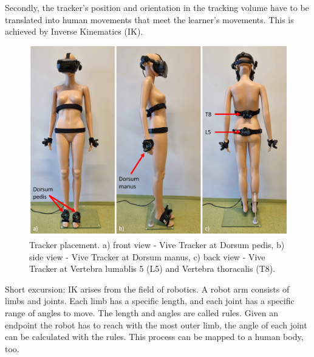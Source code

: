 Secondly, the tracker's position and orientation in the tracking volume have to be translated into human movements that meet the learner's movements. This is achieved by Inverse Kinematics (IK).\\
\begin{figure}[htb]
	\centering
	\includegraphics[width=\textwidth]{figures/trackerPlacement.png}	
	\caption[Tracker placement]{Tracker placement. a) front view - Vive Tracker at Dorsum pedis, b) side view - Vive Tracker at Dorsum manus, c) back view - Vive Tracker at Vertebra lumablis 5 (L5) and Vertebra thoracalis (T8).}
	\label{fig:tracker_placement}
\end{figure}
Short excursion: IK arises from the field of robotics. A robot arm consists of limbs and joints. Each limb has a specific length, and each joint has a specific range of angles to move. The length and angles are called rules. Given an endpoint the robot has to reach with the most outer limb, the angle of each joint can be calculated with the rules. This process can be mapped to a human body, too.\\

